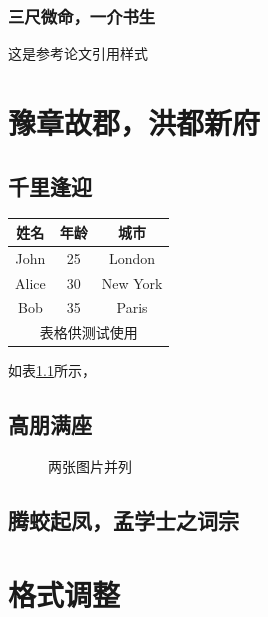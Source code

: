 \documentclass{QHUthesis}
\begin{document}
\subsection{三尺微命，一介书生}
这是参考论文引用样式\cite{kocher99,cnproceed}

\zhlipsum[1-3]
\chapter{豫章故郡，洪都新府}
\section{千里逢迎}
\zhlipsum[1-3]

\begin{table}
	\centering
	\begin{tabular}{|c|c|c|}
		\hline
		\textbf{姓名} & \textbf{年龄} & \textbf{城市} \\
		\hline
		John & 25 & London \\
		\hline
		Alice & 30 & New York \\
		\hline
		Bob & 35 & Paris \\
		\hline
		\multicolumn{3}{|c|}{表格供测试使用} \\ 
		\hline
	\end{tabular}
	\label{tab:1}
\end{table}

如表\ref{tab:1}所示，\zhlipsum[1]


\section{高朋满座}

\begin{figure}[htbp]
	\centering
	\caption{两张图片并列}
	\label{fig:subfigure_example1}
\end{figure}

\zhlipsum[1-5]
\section{腾蛟起凤，孟学士之词宗}
\chapter{格式调整}
\zhlipsum[1]
\end{document}
